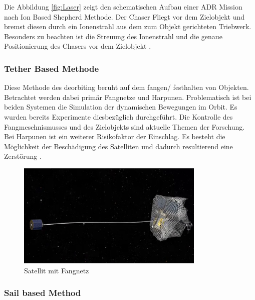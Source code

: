 	
Die Abbildung \ref{fig:Laser} zeigt den schematischen Aufbau einer ADR Mission nach Ion Based Shepherd Methode. Der Chaser Fliegt vor dem Zielobjekt und bremst diesen durch ein Ionenstrahl aus dem zum Objekt gerichteten Triebwerk. Besonders zu beachten ist die Streuung des Ionenstrahl und die genaue Positionierung des Chasers vor dem Zielobjekt \cite{Mark.2019}.

\subsubsection{Tether Based Methode}
	
	Diese Methode des deorbiting beruht auf dem fangen/ festhalten von Objekten. Betrachtet werden dabei primär Fangnetze und Harpunen. Problematisch ist bei beiden Systemen die Simulation der dynamischen Bewegungen im Orbit. Es wurden bereits Experimente diesbezüglich durchgeführt. Die Kontrolle des Fangmeschnismusses und des Zielobjekts sind aktuelle Themen der Forschung. Bei Harpunen ist ein weiterer Risikofaktor der Einschlag. Es besteht die Möglichkeit der Beschädigung des Satelliten und dadurch resultierend eine Zerstörung \cite{Mark.2019}.

	\begin{figure}[h]
			\centering
					\includegraphics[width=0.80\textwidth]{./graphics/ADR/Netz.PNG}
				\caption{Satellit mit Fangnetz \cite{.b}}
				\label{fig:Netz}
			\end{figure}

\subsubsection{Sail based Method}

